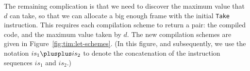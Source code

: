 The remaining complication is that we need to discover the maximum value
that $d$ can take, so that we can allocate a big enough frame with the
initial \mbox{\tt Take} instruction.  This requires each compilation scheme to return
a pair: the compiled code, and the maximum value taken by $d$.
The new compilation schemes are given in Figure~\ref{fig:tim:let-schemes}.
(In this figure, and subsequently,
we use the notation $is_1 \plusplus is_2$ to denote the
concatenation of the instruction sequences $is_1$ and $is_2$.)
